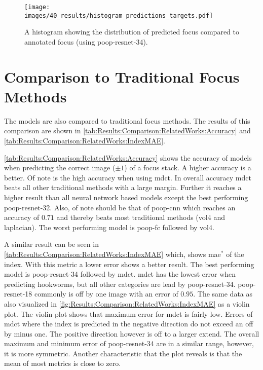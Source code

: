 \begin{figure}
    \centering
    \texttt{[image: images/40\_results/histogram\_predictions\_targets.pdf]}
    \caption{A histogram showing the distribution of predicted focus compared to annotated focus (using \acs{poop}-\acs{resnet}-34).}
    \label{fig:Results:HistogramPredictedTarget}
\end{figure}



\section{Comparison to Traditional Focus Methods}
\label{sec:Results:TraditionalFocusMethods}

The models are also compared to traditional focus methods. The results of this comparison are shown in \autoref{tab:Results:Comparison:RelatedWorks:Accuracy} and \autoref{tab:Results:Comparison:RelatedWorks:IndexMAE}.

\autoref{tab:Results:Comparison:RelatedWorks:Accuracy} shows the accuracy of models when predicting the correct image ($\pm 1$) of a focus stack. A higher accuracy is a better. Of note is the high accuracy when using \ac{mdct}. In overall accuracy \ac{mdct} beats all other traditional methods with a large margin. Further it reaches a higher result than all neural network based models except the best performing \acs{poop}-\acs{resnet}-32. Also, of note should be that of \acs{poop}-\acs{cnn} which reaches an accuracy of $0.71$ and thereby beats most traditional methods (\ac{vol4} and \ac{laplacian}). The worst performing model is \acs{poop}-\acs{fc} followed by \ac{vol4}.

A similar result can be seen in \autoref{tab:Results:Comparison:RelatedWorks:IndexMAE} which, shows \ac{mae}$^*$ of the index. With this metric a lower error shows a better result. The best performing model is \acs{poop}-\acs{resnet}-34 followed by \acs{mdct}. \Acs{mdct} has the lowest error when predicting hookworms, but all other categories are lead by \acs{poop}-\acs{resnet}-34. \Acs{poop}-\acs{resnet}-18 commonly is off by one image with an error of $0.95$. The same data as also visualized in \autoref{fig:Results:Comparison:RelatedWorks:IndexMAE} as a violin plot. The violin plot shows that maximum error for \ac{mdct} is fairly low. Errors of \ac{mdct} where the index is predicted in the negative direction do not exceed an off by minus one. The positive direction however is off to a larger extend. The overall maximum and minimum error of \acs{poop}-\acs{resnet}-34 are in a similar range, however, it is more symmetric. Another characteristic that the plot reveals is that the mean of most metrics is close to zero.


